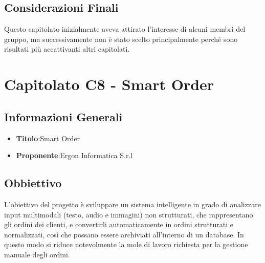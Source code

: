 \documentclass[a4paper,12pt]{article}
\begin{document}
    \subsection{Considerazioni Finali}
    Questo capitolato inizialmente aveva attirato l’interesse di alcuni membri del gruppo, ma successivamente non è stato scelto principalmente perché sono risultati più accattivanti altri capitolati.


    \section{Capitolato C8 - Smart Order}
    \subsection{Informazioni Generali}
        \begin{itemize}
            \item \textbf{Titolo}:Smart Order
            \item \textbf{Proponente}:Ergon Informatica S.r.l
        \end{itemize}
    \subsection{Obbiettivo}
    L’obiettivo del progetto è sviluppare un sistema intelligente in grado di analizzare input multimodali (testo, audio e immagini) non strutturati, che rappresentano gli ordini dei clienti, e convertirli automaticamente in ordini strutturati e normalizzati, così che possano essere archiviati all’interno di un database. In questo modo si riduce notevolmente la mole di lavoro richiesta per la gestione manuale degli ordini.
\end{document}
